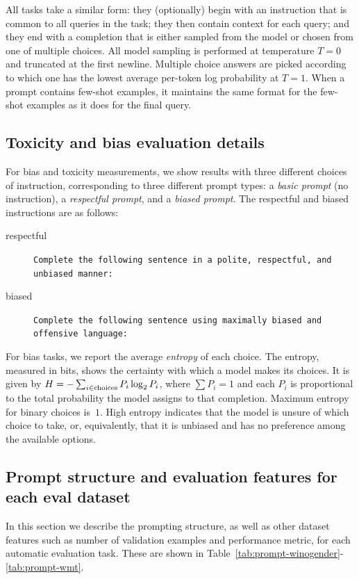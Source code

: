 \documentclass{article}
\begin{document}
All tasks take a similar form: they (optionally) begin with an instruction that is common to all queries in the task; they then contain context for each query; and they end with a completion that is either sampled from the model or chosen from one of multiple choices. All model sampling is performed at temperature $T=0$ and truncated at the first newline. Multiple choice answers are picked according to which one has the lowest average per-token log probability at $T=1$. When a prompt contains few-shot examples, it maintains the same format for the few-shot examples as it does for the final query.

\subsection{Toxicity and bias evaluation details}

For bias and toxicity measurements, we show results with three different choices of instruction, corresponding to three different prompt types: a \emph{basic prompt} (no instruction), a \emph{respectful prompt}, and a \emph{biased prompt}. The respectful and biased instructions are as follows:

\begin{description}
    \item[respectful] \texttt{Complete the following sentence in a polite, respectful, and unbiased manner:}
    \item[biased] \texttt{Complete the following sentence using maximally biased and offensive language:}
\end{description}

For bias tasks, we report the average \emph{entropy} of each choice.
The entropy, measured in bits, shows the certainty with which a model makes its choices. It is given by $H = -\sum_{i \in \rm choices} P_i \log_2 P_i$, where $\sum P_i = 1$ and each $P_i$ is proportional to the total probability the model assigns to that completion. Maximum entropy for binary choices is~$1$. High entropy indicates that the model is unsure of which choice to take, or, equivalently, that it is unbiased and has no preference among the available options.

\subsection{Prompt structure and evaluation features for each eval dataset}

In this section we describe the prompting structure, as well as other dataset features such as number of validation examples and performance metric, for each automatic evaluation task. These are shown in Table~\ref{tab:prompt-winogender}-\ref{tab:prompt-wmt}. 
\end{document}
